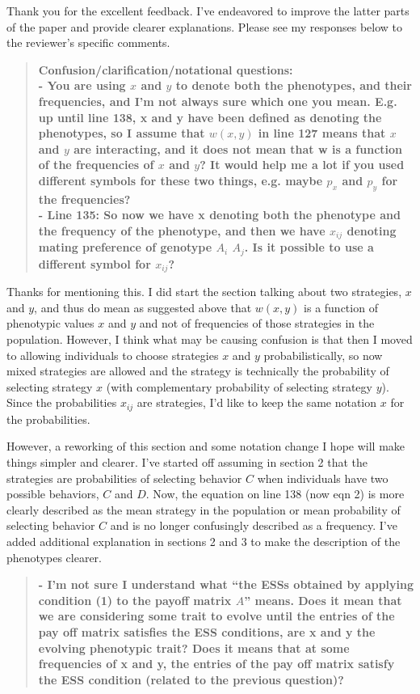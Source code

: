 \documentclass[10pt,parskip=full,foldmarks=off,addrfield=off,backaddress=false,refline=dateleft,letterpaper]{scrlttr2}
\newenvironment{reviewerquote}{\begin{quote}\color{DarkBlue}\bfseries}{\end{quote}}
\begin{document}
\begin{letter}
Thank you for the excellent feedback. I've endeavored to improve the latter parts of the paper and provide clearer explanations. Please see my responses below to the reviewer's specific comments.

\begin{reviewerquote}
Confusion/clarification/notational questions:\\
- You are using $x$ and $y$ to denote both the phenotypes, and their frequencies, and I’m not always sure which one you mean. E.g. up until line 138, x and y have been defined as denoting the phenotypes, so I assume that $w(x,y)$ in line 127 means that $x$ and $y$ are interacting, and it does not mean that w is a function of the frequencies of $x$ and $y$? It would help me a lot if you used different symbols for these two things, e.g. maybe $p_x$ and $p_y$ for the frequencies?\\
- Line 135: So now we have x denoting both the phenotype and the frequency of the phenotype, and then we have $x_{ij}$ denoting mating preference of genotype $A_i$ $A_j$. Is it possible to use a different symbol for $x_{ij}$?
\end{reviewerquote}

Thanks for mentioning this. I did start the section talking about two strategies, $x$ and $y$, and thus do mean as suggested above that $w(x,y)$ is a function of phenotypic values $x$ and $y$ and not of frequencies of those strategies in the population. However, I think what may be causing confusion is that then I moved to allowing individuals to choose strategies $x$ and $y$ probabilistically, so now mixed strategies are allowed and the strategy is technically the probability of selecting strategy $x$ (with complementary probability of selecting strategy $y$). Since the probabilities $x_{ij}$ are strategies, I'd like to keep the same notation $x$ for the probabilities.

However, a reworking of this section and some notation change I hope will make things simpler and clearer. I've started off assuming in section 2 that the strategies are probabilities of selecting behavior $C$ when individuals have two possible behaviors, $C$ and $D$. Now, the equation on line 138 (now eqn 2) is more clearly described as the mean strategy in the population or mean probability of selecting behavior $C$ and is no longer confusingly described as a frequency. I've added additional explanation in sections 2 and 3 to make the description of the phenotypes clearer.

\begin{reviewerquote}
- I’m not sure I understand what “the ESSs obtained by applying condition (1) to the payoff matrix $A$” means. Does it mean that we are considering some trait to evolve until the entries of the pay off matrix satisfies the ESS conditions, are x and y the evolving phenotypic trait? Does it means that at some frequencies of x and y, the entries of the pay off matrix satisfy the ESS condition (related to the previous question)?
\end{reviewerquote}


\end{letter}
\end{document}
